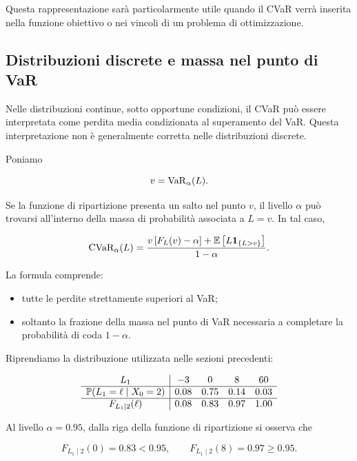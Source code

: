 Questa rappresentazione sar\`{a} particolarmente utile quando il CVaR
verr\`{a} inserita nella funzione obiettivo o nei vincoli di un
problema di ottimizzazione.

\subsection{Distribuzioni discrete e massa nel punto di VaR}

\label{subsec:cap9-cvar-discreta}

Nelle distribuzioni continue, sotto opportune condizioni, il CVaR
pu\`{o} essere interpretata come perdita media condizionata al
superamento del VaR. Questa interpretazione non \`{e} generalmente
corretta nelle distribuzioni discrete.

Poniamo

\[
v
=
\operatorname{VaR}_{\alpha}(L).
\]

Se la funzione di ripartizione presenta un salto nel punto $v$, il
livello $\alpha$ pu\`{o} trovarsi all'interno della massa di
probabilit\`{a} associata a $L=v$. In tal caso,

\[
\operatorname{CVaR}_{\alpha}(L)
=
\frac{
v\left[F_L(v)-\alpha\right]
+
\mathbb{E}\left[
L\mathbf{1}_{\{L>v\}}
\right]
}{
1-\alpha
}.
\]

La formula comprende:

\begin{itemize}

\item tutte le perdite strettamente superiori al VaR;

\item soltanto la frazione della massa nel punto di VaR necessaria a
completare la probabilit\`{a} di coda $1-\alpha$.

\end{itemize}

Riprendiamo la distribuzione utilizzata nelle sezioni precedenti:

\[
\begin{array}{c|cccc}
L_1
&
-3
&
0
&
8
&
60
\\
\hline
\mathbb{P}(L_1=\ell\mid X_0=2)
&
0.08
&
0.75
&
0.14
&
0.03
\\
\hline
F_{L_1\mid 2}(\ell)
&
0.08
&
0.83
&
0.97
&
1.00
\end{array}
\]

Al livello $\alpha=0.95$, dalla riga della funzione di ripartizione si
osserva che

\[
F_{L_1\mid 2}(0)=0.83<0.95,
\qquad
F_{L_1\mid 2}(8)=0.97\geq0.95.
\]

